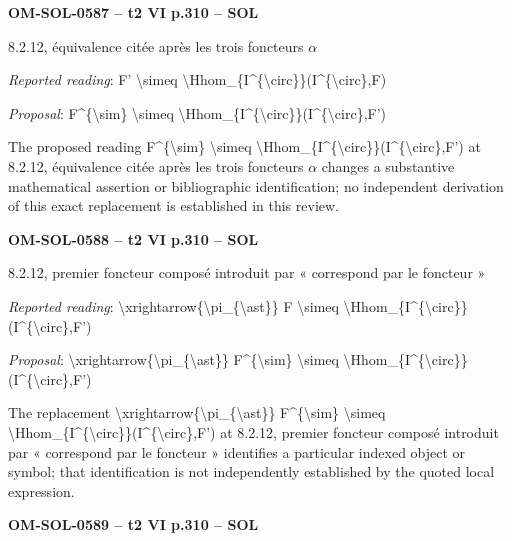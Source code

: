 \par\noindent\textbf{OM-SOL-0587 -- t2 VI p.310 -- SOL}\par
8.2.12, équivalence citée après les trois foncteurs \ensuremath{\alpha}\par
\emph{Reported reading}: F' \textbackslash{}simeq \textbackslash{}Hhom\_\{I\textasciicircum{}\{\textbackslash{}circ\}\}(I\textasciicircum{}\{\textbackslash{}circ\},F)\par
\emph{Proposal}: F\textasciicircum{}\{\textbackslash{}sim\} \textbackslash{}simeq \textbackslash{}Hhom\_\{I\textasciicircum{}\{\textbackslash{}circ\}\}(I\textasciicircum{}\{\textbackslash{}circ\},F')\par
The proposed reading F\textasciicircum{}\{\textbackslash{}sim\} \textbackslash{}simeq \textbackslash{}Hhom\_\{I\textasciicircum{}\{\textbackslash{}circ\}\}(I\textasciicircum{}\{\textbackslash{}circ\},F') at 8.2.12, équivalence citée après les trois foncteurs \ensuremath{\alpha} changes a substantive mathematical assertion or bibliographic identification; no independent derivation of this exact replacement is established in this review.\par
\par\noindent\textbf{OM-SOL-0588 -- t2 VI p.310 -- SOL}\par
8.2.12, premier foncteur composé introduit par « correspond par le foncteur »\par
\emph{Reported reading}: \textbackslash{}xrightarrow\{\textbackslash{}pi\_\{\textbackslash{}ast\}\} F \textbackslash{}simeq \textbackslash{}Hhom\_\{I\textasciicircum{}\{\textbackslash{}circ\}\}(I\textasciicircum{}\{\textbackslash{}circ\},F')\par
\emph{Proposal}: \textbackslash{}xrightarrow\{\textbackslash{}pi\_\{\textbackslash{}ast\}\} F\textasciicircum{}\{\textbackslash{}sim\} \textbackslash{}simeq \textbackslash{}Hhom\_\{I\textasciicircum{}\{\textbackslash{}circ\}\}(I\textasciicircum{}\{\textbackslash{}circ\},F')\par
The replacement \textbackslash{}xrightarrow\{\textbackslash{}pi\_\{\textbackslash{}ast\}\} F\textasciicircum{}\{\textbackslash{}sim\} \textbackslash{}simeq \textbackslash{}Hhom\_\{I\textasciicircum{}\{\textbackslash{}circ\}\}(I\textasciicircum{}\{\textbackslash{}circ\},F') at 8.2.12, premier foncteur composé introduit par « correspond par le foncteur » identifies a particular indexed object or symbol; that identification is not independently established by the quoted local expression.\par
\par\noindent\textbf{OM-SOL-0589 -- t2 VI p.310 -- SOL}\par
